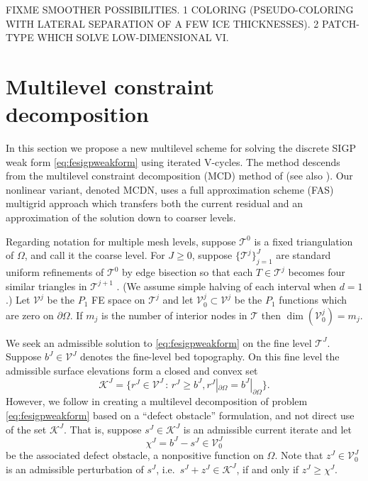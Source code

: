 \documentclass[letterpaper,final,12pt,reqno]{amsart}
\theoremstyle{claim}
\numberwithin{equation}{section}
\numberwithin{figure}{section}
\numberwithin{table}{section}
\numberwithin{theorem}{section}
\begin{document}
FIXME SMOOTHER POSSIBILITIES.  1 COLORING (PSEUDO-COLORING WITH LATERAL SEPARATION OF A FEW ICE THICKNESSES).  2 PATCH-TYPE WHICH SOLVE LOW-DIMENSIONAL VI.


\section{Multilevel constraint decomposition} \label{sec:mcdstokes}

In this section we propose a new multilevel scheme for solving the discrete SIGP weak form \eqref{eq:fesigpweakform} using iterated V-cycles.  The method descends from the multilevel constraint decomposition (MCD) method of \cite{Tai2003} (see also \cite{GraeserKornhuber2009}).  Our nonlinear variant, denoted MCDN, uses a full approximation scheme (FAS) multigrid \cite{Trottenbergetal2001} approach which transfers both the current residual and an approximation of the solution down to coarser levels.

Regarding notation for multiple mesh levels, suppose $\mathcal{T}^0$ is a fixed triangulation of $\Omega$, and call it the coarse level.  For $J\ge 0$, suppose $\{\mathcal{T}^j\}_{j=1}^J$ are standard uniform refinements of $\mathcal{T}^0$ by edge bisection so that each $T \in \mathcal{T}^j$ becomes four similar triangles in $\mathcal{T}^{j+1}$ \cite{Braess2007}.  (We assume simple halving of each interval when $d=1$.)  Let $\mathcal{V}^j$ be the $P_1$ FE space on $\mathcal{T}^j$ and let $\mathcal{V}_0^j \subset \mathcal{V}^j$ be the $P_1$ functions which are zero on $\partial\Omega$.  If $m_j$ is the number of interior nodes in $\mathcal{T}$ then $\dim(\mathcal{V}_0^j)=m_j$.

We seek an admissible solution to \eqref{eq:fesigpweakform} on the fine level $\mathcal{T}^J$.  Suppose $b^J \in \mathcal{V}^J$ denotes the fine-level bed topography.  On this fine level the admissible surface elevations form a closed and convex set
\begin{equation}
\mathcal{K}^J = \{r^J \in \mathcal{V}^J \,:\, r^J \ge b^J, r^J|_{\partial\Omega} = b^J|_{\partial\Omega}\}.  \label{eq:singleadmissible}
\end{equation}
However, we follow \cite{GraeserKornhuber2009} in creating a multilevel decomposition of problem \eqref{eq:fesigpweakform} based on a ``defect obstacle'' formulation, and not direct use of the set $\mathcal{K}^J$.  That is, suppose $s^J \in \mathcal{K}^J$ is an admissible current iterate and let
\begin{equation}
\chi^J = b^J - s^J \in \mathcal{V}_0^J \label{eq:finedefectobstacle}
\end{equation}
be the associated defect obstacle, a nonpositive function on $\Omega$.  Note that $z^J \in \mathcal{V}_0^J$ is an admissible perturbation of $s^J$, i.e.~$s^J+z^J \in \mathcal{K}^J$, if and only if $z^J \ge \chi^J$.
\end{document}
